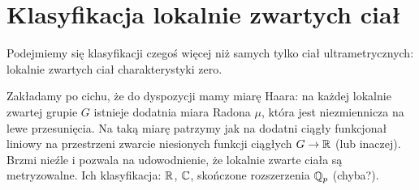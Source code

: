 \section{Klasyfikacja lokalnie zwartych ciał}
Podejmiemy się klasyfikacji czegoś więcej niż samych tylko ciał ultrametrycznych: lokalnie zwartych ciał charakterystyki zero.

Zakładamy po cichu, że do dyspozycji mamy miarę Haara: na każdej lokalnie zwartej grupie $G$ istnieje dodatnia miara Radona $\mu$, która jest niezmiennicza na lewe przesunięcia.
Na taką miarę patrzymy jak na dodatni ciągły funkcjonał liniowy na przestrzeni zwarcie niesionych funkcji ciągłych $G \to \mathbb R$ (lub inaczej).
Brzmi nieźle i pozwala na udowodnienie, że lokalnie zwarte ciała są metryzowalne.
Ich klasyfikacja: $\mathbb R$, $\mathbb C$, skończone rozszerzenia $\mathbb Q_p$ (chyba?).
